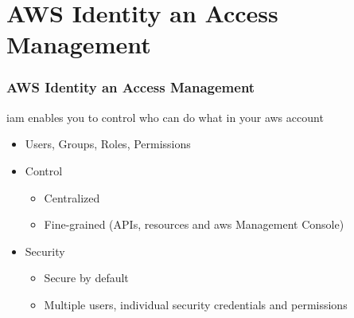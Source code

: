 \documentclass{beamer}
\begin{document}
\section{AWS Identity an Access Management}
\begin{frame}[fragile]
\frametitle{AWS Identity an Access Management}
\acrfull{iam} enables you to control who can do what in your \acrfull{aws} account
\begin{itemize}
 \item Users, Groups, Roles, Permissions
 \item Control
  \begin{itemize}
   \item Centralized
   \item Fine-grained (APIs, resources and \acrshort{aws} Management Console)
  \end{itemize}

 \item Security
 \begin{itemize}
    \item Secure by default
    \item Multiple users, individual security credentials and permissions
  \end{itemize}
\end{itemize}
\end{frame}
\end{document}
